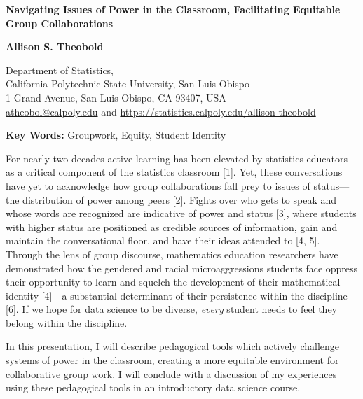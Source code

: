\documentclass[11pt]{article}
\begin{document}



\begin{center}
  {\Large
    {\bf
	Navigating Issues of Power in the Classroom, Facilitating Equitable Group Collaborations
    }
  }
  
  \medskip
  
  {\bf
    Allison S. Theobold
    }
  
  \smallskip

{
    Department of Statistics, \\
    California Polytechnic State University, San Luis Obispo \\
    1 Grand Avenue, San Luis Obispo, CA 93407, USA \\
    \href{mailto:atheobol@calpoly.edu}{atheobol@calpoly.edu} and \url{https://statistics.calpoly.edu/allison-theobold}\\
}
 
\end{center}

\medskip

{\bf Key Words:} Groupwork, Equity, Student Identity

\medskip

For nearly two decades active learning has been elevated by statistics educators as a critical component of the statistics classroom [1]. 
Yet, these conversations have yet to acknowledge how group collaborations fall prey to issues of status—the distribution of power among peers
[2]. Fights over who gets to speak and whose words are recognized are indicative of power and status [3], where students with higher 
status are positioned as credible sources of information, gain and maintain the conversational floor, and have their ideas attended to [4, 5].
Through the lens of group discourse, mathematics education researchers have demonstrated how the gendered and racial microaggressions
students face oppress their opportunity to learn and squelch the development of their mathematical identity [4]---a substantial determinant
of their persistence within the discipline [6]. If we hope for data science to be diverse, \emph{every} student needs to feel they belong within the
discipline. 

In this presentation, I will describe pedagogical tools which actively challenge systems of power in the classroom, creating a more
equitable environment for collaborative group work. I will conclude with a discussion of my experiences using these pedagogical 
tools in an introductory data science course. 
 
\end{document}
